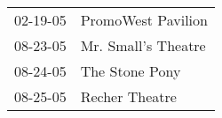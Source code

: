 \begin{supertabular}{p{0.07\textwidth}p{0.23\textwidth}}
 02-19-05 &   PromoWest Pavilion \\
 08-23-05 &  Mr. Small's Theatre \\
 08-24-05 &       The Stone Pony \\
 08-25-05 &       Recher Theatre \\
\end{supertabular}
